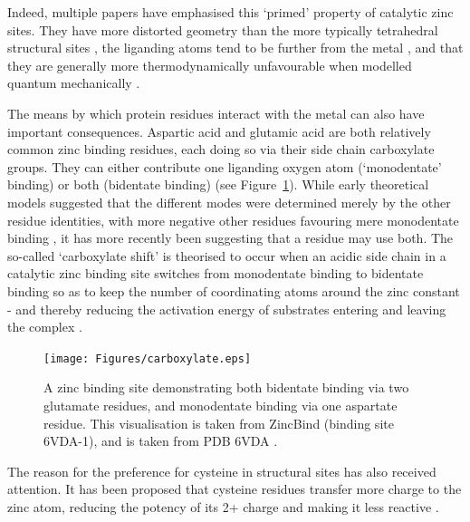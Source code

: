 Indeed, multiple papers have emphasised this `primed' property of catalytic zinc sites. They have more distorted geometry than the more typically tetrahedral structural sites \cite{roe1999zinc}, the liganding atoms tend to be further from the metal \cite{lee2008physical}, and that they are generally more thermodynamically unfavourable when modelled quantum mechanically \cite{sousa2009zinc}.

The means by which protein residues interact with the metal can also have important consequences. Aspartic acid and glutamic acid are both relatively common zinc binding residues, each doing so via their side chain carboxylate groups. They can either contribute one liganding oxygen atom (`monodentate' binding) or both (bidentate binding) (see
Figure~\ref{fig:carboxylate}). While early theoretical models suggested that the different modes were determined merely by the other residue identities, with more negative other residues favouring mere monodentate binding \cite{ryde1999carboxylate}, it has more recently been suggesting that a residue may use both. The so-called `carboxylate shift' is theorised to occur when an acidic side chain in a catalytic zinc binding site switches from monodentate binding to bidentate binding so as to keep the number of coordinating atoms around the zinc constant - and thereby reducing the activation energy of substrates entering and leaving the complex \cite{sousa2007carboxylate}.

\begin{figure}
\centering
\texttt{[image: Figures/carboxylate.eps]}
\caption[Monodentate and bidentate binding]{\label{fig:carboxylate} A zinc binding site demonstrating both bidentate binding via two glutamate residues, and monodentate binding via one aspartate residue. This visualisation is taken from ZincBind (binding site 6VDA-1), and is taken from PDB 6VDA \cite{udagedara2020pdb}.}
\end{figure}


The reason for the preference for cysteine in structural sites has also received attention. It has been proposed that cysteine residues transfer more charge to the zinc atom, reducing the potency of its 2+ charge and making it less reactive \cite{lee2008physical}. 

